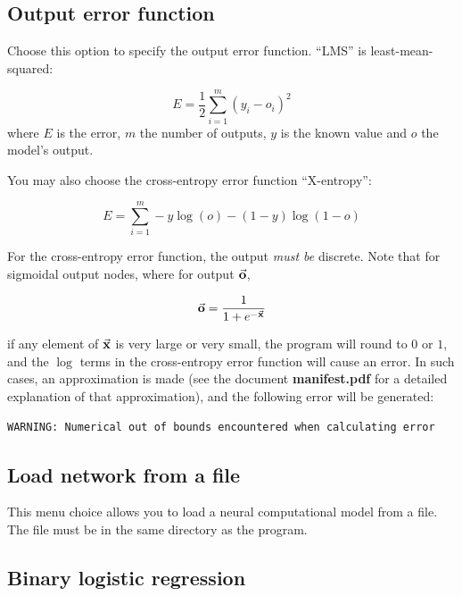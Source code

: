 \subsection{Output error function}

Choose this option to specify the output error function.  ``LMS'' is
least-mean-squared:

\begin{equation}
E = \frac{1}{2} \sum_{i=1}^{m} (y_i - o_i)^2
\end{equation}
where $E$ is the error, $m$ the number of outputs, $y$ is the known
value and $o$ the model's output.

You may also choose the cross-entropy error function ``X-entropy'':

\begin{equation}
E = \sum_{i=1}^{m} -y\log(o)-(1-y)\log(1-o)
\end{equation}

For the cross-entropy error function, the output {\em must be}
discrete.  Note that for sigmoidal output nodes, where for
output $\vec{\bf{o}}$,

\begin{displaymath}
\vec{\bf{o}} = \frac{1}{1+e^{-\vec{\bf{x}}}}
\end{displaymath}

if any element of $\vec{\bf{x}}$ is very large or very small,
the program will round to $0$ or $1$, and the $\log$ terms in the
cross-entropy error function will cause an error.  In such cases,
an approximation is made (see the document {\bf manifest.pdf}
for a detailed explanation of that approximation), and the following
error will be generated:

\begin{verbatim}
WARNING: Numerical out of bounds encountered when calculating error
\end{verbatim}

\subsection{Load network from a file}

This menu choice allows you to load a neural computational model from
a file.  The file must be in the same directory as the program.

\subsection{Binary logistic regression}

